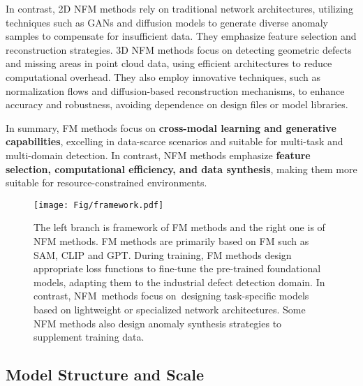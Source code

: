 \documentclass[journal,comsoc]{IEEEtran}
\begin{document}
In contrast, 2D NFM methods rely on traditional network architectures, utilizing techniques such as GANs \cite{al2024enhanced} and diffusion models \cite{bhosale2024anomaly} to generate diverse anomaly samples to compensate for insufficient data. They emphasize feature selection and reconstruction 
 \cite{kim2024rethinking,yao2025glad,rafiee2024dcor,patra2024revisiting}strategies. 3D NFM methods focus on detecting geometric defects and missing areas in point cloud data, using efficient architectures to reduce computational overhead. They also employ innovative techniques, such as normalization flows \cite{lee2024gdflow,zhou2024vq} and diffusion-based reconstruction mechanisms, to enhance accuracy and robustness, avoiding dependence on design files or model libraries.

In summary, FM methods focus on \textbf{cross-modal learning and generative capabilities}, excelling in data-scarce scenarios and suitable for multi-task and multi-domain detection. In contrast, NFM methods emphasize \textbf{feature selection, computational efficiency, and data synthesis}, making them more suitable for resource-constrained environments.

\begin{figure*}[t]
    \centering
    \texttt{[image: Fig/framework.pdf]}
    \caption{The left branch is framework of FM methods and the right one is of NFM methods. FM methods are primarily based on FM such as SAM, CLIP and GPT. During training, FM methods design appropriate loss functions to fine-tune the pre-trained foundational models, adapting them to the industrial defect detection domain. In contrast, NFM methods focus on designing task-specific models based on lightweight or specialized network architectures. Some NFM methods also design anomaly synthesis strategies to supplement training data.}
\end{figure*}

\subsection{Model Structure and Scale}
\end{document}
